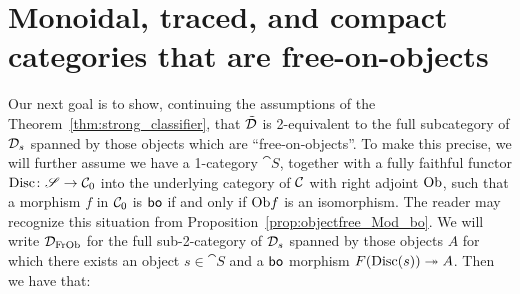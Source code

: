 \documentclass[11pt,oneside,article]{memoir}
\begin{document}
\section{Monoidal, traced, and compact categories that are free-on-objects}

Our next goal is to show, continuing the assumptions of the Theorem~\ref{thm:strong_classifier},
that $\tilde{\mathcal{D}}$ is 2-equivalent to the full subcategory of $\mathcal{D}_s$ spanned by those objects which
are ``free-on-objects''. To make this precise, we will further assume we have a 1-category
$\cat{S}$, together with a fully faithful functor $\mathrm{Disc}\colon\mathscr{S}\to\mathcal{C}_0$ into the
underlying category of $\mathcal{C}$ with right adjoint $\mathrm{Ob}$, such that a morphism $f$ in $\mathcal{C}_0$
is $\mathsf{bo}$ if and only if $\mathrm{Ob} f$ is an isomorphism. The reader may recognize this situation from
Proposition~\ref{prop:objectfree_Mod_bo}. We will write $\mathcal{D}_{\mathrm{FrOb}}$ for the full sub-2-category
of $\mathcal{D}_s$ spanned by those objects $A$ for which there exists an object $s\in\cat{S}$ and a
$\mathsf{bo}$ morphism $F(\mathrm{Disc}(s))\twoheadrightarrow A$. Then we have that:
\end{document}
